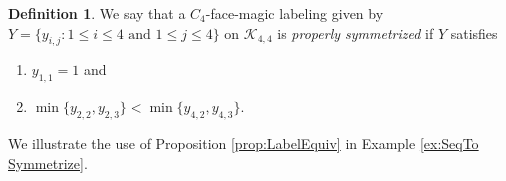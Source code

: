 \documentclass[10pt, reqno]{amsart}
\theoremstyle{definition}
\newtheorem{definition}{Definition}
\theoremstyle{plain}
\begin{document}
\begin{definition} \label{Defn:ProperlySymmetrized}
    We say that a $C_4$-face-magic labeling given by\\
   $Y=\{y_{i,j}: 1\le i \le 4 \text{ and } 
   1\le j \le 4\}$ 
   on  $\mathcal{K}_{4,4}$
   is \textit{properly symmetrized}
  if $Y$ satisfies 
   \begin{enumerate}
       \item $y_{1,1}=1$ and
        \item $\min\{ y_{2,2},y_{2,3}\}
        <\min\{ y_{4,2},y_{4,3}\}$.
    \end{enumerate}
\end{definition}

We illustrate the use of Proposition \ref{prop:LabelEquiv}
in Example \ref{ex:SeqTo Symmetrize}.
\end{document}
